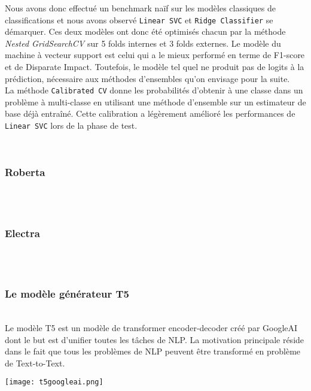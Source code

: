 Nous avons donc effectué un benchmark naïf sur les modèles classiques de classifications et nous avons observé \texttt{Linear SVC} et \texttt{Ridge Classifier} se démarquer. Ces deux modèles ont donc été optimisés chacun par la méthode \textit{Nested GridSearchCV} sur \textsf{5} folds internes et \textsf{3} folds externes. Le modèle du machine à vecteur support est celui qui a le mieux performé en terme de F1-score et de Disparate Impact. Toutefois, le modèle tel quel ne produit pas de logits à la prédiction, nécessaire aux méthodes d'ensembles qu'on envisage pour la suite.\\
La méthode \texttt{Calibrated CV} donne les probabilités d'obtenir à une classe dans un problème à multi-classe en utilisant une méthode d'ensemble sur un estimateur de base déjà entraîné. Cette calibration a légèrement amélioré les performances de \texttt{Linear SVC} lors de la phase de test.

\hfill\\
\subsubsection{Roberta}
\hfill\\

\hfill\\
\subsubsection{Electra}
\hfill\\

\hfill\\
\subsubsection{Le modèle générateur T5}
\hfill\\
Le modèle T5 est un modèle de transformer encoder-decoder créé par GoogleAI dont le but est d'unifier toutes les tâches de NLP. La motivation principale réside dans le fait que tous les problèmes de NLP peuvent être transformé en problème de Text-to-Text.

\texttt{[image: t5googleai.png]}

